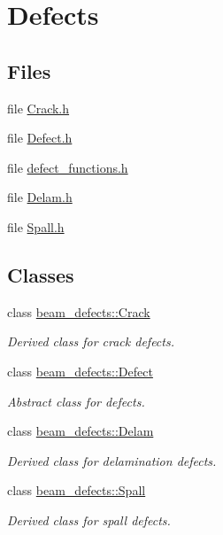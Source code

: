 \hypertarget{group__defects}{}\section{Defects}
\label{group__defects}
\subsection*{Files}
\begin{DoxyCompactItemize}
\item 
file \hyperlink{_crack_8h}{Crack.\+h}
\item 
file \hyperlink{_defect_8h}{Defect.\+h}
\item 
file \hyperlink{defect__functions_8h}{defect\+\_\+functions.\+h}
\item 
file \hyperlink{_delam_8h}{Delam.\+h}
\item 
file \hyperlink{_spall_8h}{Spall.\+h}
\end{DoxyCompactItemize}
\subsection*{Classes}
\begin{DoxyCompactItemize}
\item 
class \hyperlink{classbeam__defects_1_1_crack}{beam\+\_\+defects\+::\+Crack}
\begin{DoxyCompactList}\small\item\em Derived class for crack defects. \end{DoxyCompactList}\item 
class \hyperlink{classbeam__defects_1_1_defect}{beam\+\_\+defects\+::\+Defect}
\begin{DoxyCompactList}\small\item\em Abstract class for defects. \end{DoxyCompactList}\item 
class \hyperlink{classbeam__defects_1_1_delam}{beam\+\_\+defects\+::\+Delam}
\begin{DoxyCompactList}\small\item\em Derived class for delamination defects. \end{DoxyCompactList}\item 
class \hyperlink{classbeam__defects_1_1_spall}{beam\+\_\+defects\+::\+Spall}
\begin{DoxyCompactList}\small\item\em Derived class for spall defects. \end{DoxyCompactList}\end{DoxyCompactItemize}
